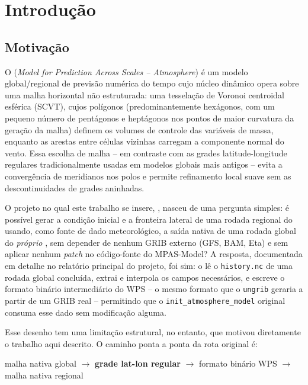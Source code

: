 \chapter{Introdução}
\label{cap:introducao}

\section{Motivação}

O \mpasa{} (\textit{Model for Prediction Across Scales -- Atmosphere})
\cite{skamarock2012voronoi} é um modelo global/regional de previsão
numérica do tempo cujo núcleo dinâmico opera sobre uma malha horizontal
não estruturada: uma tesselação de Voronoi centroidal esférica (SCVT),
cujos polígonos (predominantemente hexágonos, com um pequeno número de
pentágonos e heptágonos nos pontos de maior curvatura da geração da
malha) definem os volumes de controle das variáveis de massa, enquanto
as arestas entre células vizinhas carregam a componente normal do vento.
Essa escolha de malha -- em contraste com as grades latitude-longitude
regulares tradicionalmente usadas em modelos globais mais antigos --
evita a convergência de meridianos nos polos e permite refinamento local
suave sem as descontinuidades de grades aninhadas.

O projeto no qual este trabalho se insere, \selfgrib{}, nasceu de uma
pergunta simples: é possível gerar a condição inicial e a fronteira
lateral de uma rodada regional do \mpasa{} usando, como fonte de dado
meteorológico, a saída nativa de uma rodada global do \emph{próprio}
\mpasa{}, sem depender de nenhum GRIB externo (GFS, BAM, Eta) e sem
aplicar nenhum \emph{patch} no código-fonte do MPAS-Model? A resposta,
documentada em detalhe no relatório principal do projeto, foi sim: o
\selfgrib{} lê o \texttt{history.nc} de uma rodada global concluída,
extrai e interpola os campos necessários, e escreve o formato binário
intermediário do WPS -- o mesmo formato que o \texttt{ungrib} geraria a
partir de um GRIB real -- permitindo que o \texttt{init\_atmosphere\_model}
original consuma esse dado sem modificação alguma.

Esse desenho tem uma limitação estrutural, no entanto, que motivou
diretamente o trabalho aqui descrito. O caminho ponta a ponta da rota
original é:

\begin{center}
malha nativa global $\to$ \textbf{grade lat-lon regular} $\to$ formato
binário WPS $\to$ malha nativa regional
\end{center}

